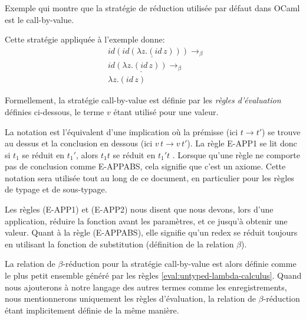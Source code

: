 \begin{listing}
  \inputminted{OCaml}{codes/untyped-call-by-value-example.ml}
  \caption{Exemple qui montre que la stratégie de réduction utilisée par défaut
    dans OCaml est le call-by-value.}
\end{listing}

Cette stratégie appliquée à l'exemple donne:
\begin{align*}
  & id \underline{(id (\lambda z . (id \, z)))} \rightarrow_{\beta}\\
  & id \underline{(\lambda z . (id \, z))} \rightarrow_{\beta} \\
  & \lambda z . (id \, z)
\end{align*}

\label{fig:untyped-lambda-calculus-evaluation-rules}

Formellement, la stratégie call-by-value est définie par les \textit{règles
  d'évaluation} définies ci-dessous, le terme $v$ étant utilisé pour une valeur.

\label{eval:untyped-lambda-calculus}

La notation  est
l'équivalent d'une implication où la prémisse (ici $t \rightarrow t'$) se trouve au dessus et la
conclusion en dessous (ici $v \, t \rightarrow v \, t'$). La règle E-APP1 se lit
donc \og si $t_{1}$ se réduit en $t_{1}'$, alors $t_{1} t$ se réduit en
$t_{1}'t$ \fg. Lorsque qu'une règle
ne comporte pas de conclusion comme E-APPABS, cela signifie que c'est un axiome.
Cette notation sera
utilisée tout au long de ce document, en particulier pour les règles de typage
et de sous-typage.

Les règles (E-APP1) et (E-APP2) nous disent que nous devons, lors d'une
application, réduire la fonction avant les paramètres, et ce jusqu'à obtenir une
valeur. Quant à la règle (E-APPABS), elle signifie qu'un redex se réduit toujours
en utilisant la fonction de substitution (définition de la relation $\beta$).

La relation de $\beta$-réduction pour la stratégie call-by-value est alors
définie comme le plus petit ensemble généré par les règles
\ref{eval:untyped-lambda-calculus}. Quand nous ajouterons à notre langage des
autres termes comme les enregistrements, nous mentionnerons uniquement les
règles d'évaluation, la relation de $\beta$-réduction étant implicitement
définie de la même manière.

